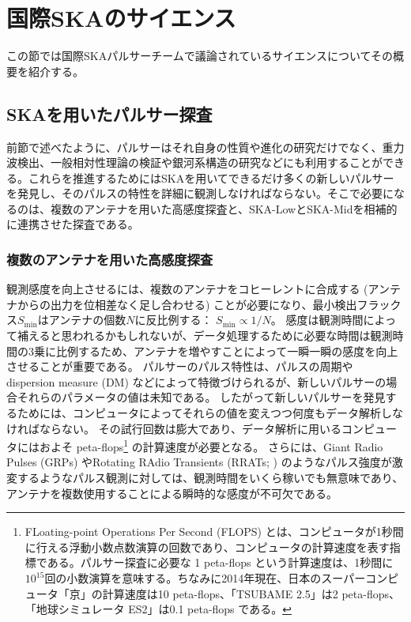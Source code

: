 \section{国際SKAのサイエンス}\label{pulsar.s2}

この節では国際SKAパルサーチームで議論されているサイエンスについてその概要を紹介する。


\subsection{SKAを用いたパルサー探査}
前節で述べたように、パルサーはそれ自身の性質や進化の研究だけでなく、重力波検出、一般相対性理論の検証や銀河系構造の研究などにも利用することができる。これらを推進するためにはSKAを用いてできるだけ多くの新しいパルサーを発見し、そのパルスの特性を詳細に観測しなければならない。そこで必要になるのは、複数のアンテナを用いた高感度探査と、SKA-LowとSKA-Midを相補的に連携させた探査である。

\subsubsection{複数のアンテナを用いた高感度探査}
観測感度を向上させるには、複数のアンテナをコヒーレントに合成する (アンテナからの出力を位相差なく足し合わせる) ことが必要になり、最小検出フラックス$S_\text{min}$はアンテナの個数$N$に反比例する： $S_\text{min}\propto 1/N$。
感度は観測時間によって補えると思われるかもしれないが、データ処理するために必要な時間は観測時間の3乗に比例するため、アンテナを増やすことによって一瞬一瞬の感度を向上させることが重要である。
パルサーのパルス特性は、パルスの周期や dispersion measure (DM) などによって特徴づけられるが、新しいパルサーの場合それらのパラメータの値は未知である。
したがって新しいパルサーを発見するためには、コンピュータによってそれらの値を変えつつ何度もデータ解析しなければならない。
その試行回数は膨大であり、データ解析に用いるコンピュータにはおよそ peta-flops\footnote{FLoating-point Operations Per Second (FLOPS) とは、コンピュータが1秒間に行える浮動小数点数演算の回数であり、コンピュータの計算速度を表す指標である。パルサー探査に必要な 1 peta-flops という計算速度は、1秒間に$10^{15}$回の小数演算を意味する。ちなみに2014年現在、日本のスーパーコンピュータ「京」の計算速度は10 peta-flops、「TSUBAME 2.5」は2 peta-flops、「地球シミュレータ ES2」は0.1 peta-flops である。} の計算速度が必要となる。
さらには、Giant Radio Pulses (GRPs) やRotating RAdio Transients (RRATs; \cite{McLaughlin06}) のようなパルス強度が激変するようなパルス観測に対しては、観測時間をいくら稼いでも無意味であり、アンテナを複数使用することによる瞬時的な感度が不可欠である。

